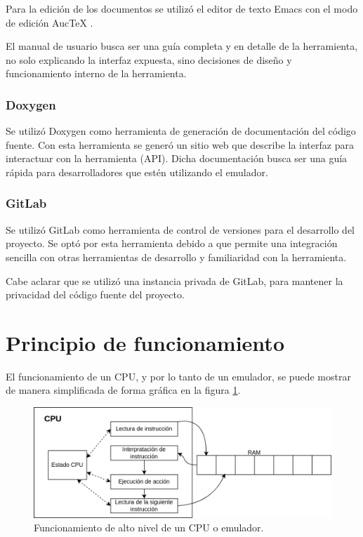 Para la edición de los documentos se utilizó el editor de texto Emacs con el modo de edición AucTeX \citep{AUCTEX}.

El manual de usuario busca ser una guía completa y en detalle de la herramienta, no solo explicando la interfaz expuesta, sino decisiones de diseño y funcionamiento interno de la herramienta.

\subsubsection{Doxygen}
\label{subsec:doxygen}

Se utilizó Doxygen \citep{DOXYGEN} como herramienta de generación de documentación del código fuente. Con esta herramienta se generó un sitio web que describe la interfaz para interactuar con la herramienta (API). Dicha documentación busca ser una guía rápida para desarrolladores que estén utilizando el emulador.

\subsubsection{GitLab}
\label{subsec:gitlab}

Se utilizó GitLab \citep{GITLAB} como herramienta de control de versiones para el desarrollo del proyecto. Se optó por esta herramienta debido a que permite una integración sencilla con otras herramientas de desarrollo y familiaridad con la herramienta.

Cabe aclarar que se utilizó una instancia privada de GitLab, para mantener la privacidad del código fuente del proyecto.


\section{Principio de funcionamiento}
\label{sec:principio_funcionamiento}

El funcionamiento de un CPU, y por lo tanto de un emulador, se puede mostrar de manera simplificada de forma gráfica en la figura \ref{fig:functionamiento_emulador}.

\begin{figure}[htbp]
	\centering
	\includegraphics[width=1\textwidth]{./Figures/funcionamiento_emulador}
	\caption{Funcionamiento de alto nivel de un CPU o emulador.}
	\label{fig:functionamiento_emulador}
\end{figure}

